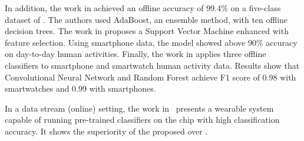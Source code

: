 In addition, the work in \cite{ugulino2012} achieved an offline accuracy of
99.4\% on a five-class dataset of \har. The authors used AdaBoost, an ensemble
method, with ten offline decision trees. The work in \cite{ahmed2019smartphone}
proposes a Support Vector Machine enhanced with feature selection. Using
smartphone data, the model showed above 90\% accuracy on day-to-day human
activities. Finally, the work in \cite{san2018robust} applies three offline
classifiers to smartphone and smartwatch human activity data. Results show that
Convolutional Neural Network and Random Forest achieve F1 score of 0.98 with
smartwatches and 0.99 with smartphones.

In a data stream (online) setting, the work in~\cite{omid_2019} presents a
wearable system capable of running pre-trained classifiers on the chip with high
classification accuracy. It shows the superiority of the proposed \FNN over
\knn.

